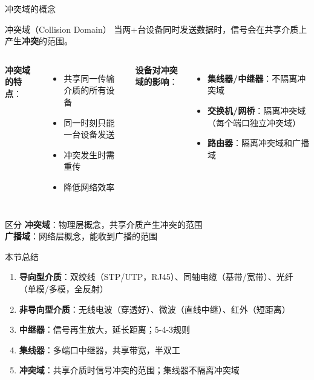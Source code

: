 \documentclass[10pt, aspectratio=169]{beamer}
\begin{document}
\begin{frame}{冲突域的概念}
    \begin{block}{冲突域（Collision Domain）}
        当两$+$台设备同时发送数据时，信号会在共享介质上产生\textbf{冲突}的范围。
    \end{block}
    \vspace{0.3em}
    \begin{columns}[T]
        \textbf{冲突域的特点}：
        \begin{itemize}
            \item 共享同一传输介质的所有设备
            \item 同一时刻只能一台设备发送
            \item 冲突发生时需重传
            \item 降低网络效率
        \end{itemize}
        \textbf{设备对冲突域的影响}：
        \begin{itemize}
            \item \textbf{集线器/中继器}：不隔离冲突域
            \item \textbf{交换机/网桥}：隔离冲突域（每个端口独立冲突域）
            \item \textbf{路由器}：隔离冲突域和广播域
        \end{itemize}
    \end{columns}
    \vspace{0.5em}
    \begin{exampleblock}{区分}
        \textbf{冲突域}：物理层概念，共享介质产生冲突的范围\\
        \textbf{广播域}：网络层概念，能收到广播的范围
    \end{exampleblock}
\end{frame}

\begin{frame}{本节总结}
    \begin{enumerate}
        \item \textbf{导向型介质}：双绞线（STP/UTP，RJ45）、同轴电缆（基带/宽带）、光纤（单模/多模，全反射）
        \item \textbf{非导向型介质}：无线电波（穿透好）、微波（直线中继）、红外（短距离）
        \item \textbf{中继器}：信号再生放大，延长距离；5-4-3规则
        \item \textbf{集线器}：多端口中继器，共享带宽，半双工
        \item \textbf{冲突域}：共享介质时信号冲突的范围；集线器不隔离冲突域
    \end{enumerate}
\end{frame}
\end{document}
